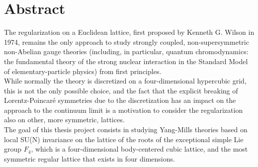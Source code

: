 \thispagestyle{empty}
\section*{Abstract}
The regularization on a Euclidean lattice, first proposed by Kenneth G. Wilson in 1974, remains the only approach to study strongly coupled, non-supersymmetric non-Abelian gauge theories (including, in particular, quantum chromodynamics: the fundamental theory of the strong nuclear interaction in the Standard Model of elementary-particle physics) from first principles.\\
While normally the theory is discretized on a four-dimensional hypercubic grid, this is not the only possible choice, and the fact that the explicit breaking of Lorentz-Poincaré symmetries due to the discretization has an impact on the approach to the continuum limit is a motivation to consider the regularization also on other, more symmetric, lattices.\\
The goal of this thesis project consists in studying Yang-Mills theories based on local SU(N) invariance on the lattice of the roots of the exceptional simple Lie group $F_4$, which is a four-dimensional body-centered cubic lattice, and the most symmetric regular lattice that exists in four dimensions.
\cleardoublepage
